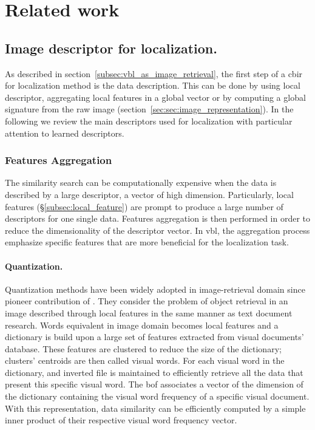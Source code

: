 \section{Related work}
\label{sec:cbir_data_for_loc}

\subsection{Image descriptor for localization.}

As described in section~\ref{subsec:vbl_as_image_retrieval}, the first step of a \ac{cbir} for localization method is the data description. This can be done by using local descriptor, aggregating local features in a global vector or by computing a global signature from the raw image (section~\ref{sec:sec:image_representation}). In the following we review the main descriptors used for localization with particular attention to learned descriptors.

\subsubsection{Features Aggregation}
\label{subsec:features_aggregation}
The similarity search can be computationally expensive when the data is described by a large descriptor, \ie a vector of high dimension. Particularly, local features (\S\ref{subsec:local_feature}) are prompt to produce a large number of descriptors for one single data. Features aggregation is then performed in order to reduce the dimensionality of the descriptor vector. In \ac{vbl}, the aggregation process emphasize specific features that are more beneficial for the localization task.

\paragraph{Quantization.} Quantization methods have been widely adopted in image-retrieval domain since pioneer contribution of \citet{Sivic2003}. They consider the problem of object retrieval in an image described through local features in the same manner as text document research. Words equivalent in image domain becomes local features and a dictionary is build upon a large set of features extracted from visual documents' database. These features are clustered to reduce the size of the dictionary; clusters' centroids are then called visual words. For each visual word in the dictionary, and inverted file is maintained to efficiently retrieve all the data that present this specific visual word. The \ac{bof} associates a vector of the dimension of the dictionary containing the visual word frequency of a specific visual document. With this representation, data similarity can be efficiently computed by a simple inner product of their respective visual word frequency vector.

